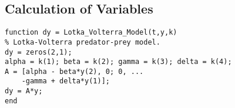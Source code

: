 \documentclass{article}
\begin{document}
\subsection*{Calculation of Variables}
\begin{lstlisting}[style=Matlab-editor]
function dy = Lotka_Volterra_Model(t,y,k)
% Lotka-Volterra predator-prey model.
dy = zeros(2,1);
alpha = k(1); beta = k(2); gamma = k(3); delta = k(4);
A = [alpha - beta*y(2), 0; 0, ...
    -gamma + delta*y(1)];
dy = A*y;
end
\end{lstlisting}


\newpage
\end{document}
